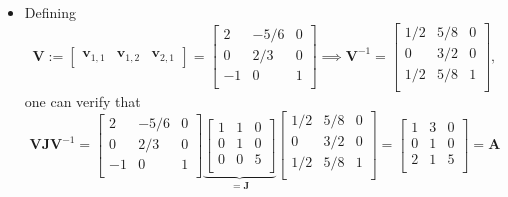 \documentclass[12pt,a4paper]{article}
\begin{document}
\begin{itemize}
\begin{itemize}
  \item Defining
    \begin{equation}\nonumber%
      \bm{V} :=
      \begin{bmatrix}
        \bm{v}_{1,1} & \bm{v}_{1,2} & \bm{v}_{2,1}
      \end{bmatrix}
      =
      \begin{bmatrix}
        2 & - 5/6 & 0 \\
        0 & 2/3 & 0 \\
        -1 & 0 & 1 \\
      \end{bmatrix}
      \implies
      \bm{V}^{-1}
      = 
      \begin{bmatrix}
        1/2 & 5/8 & 0 \\
        0 & 3/2 & 0 \\
        1/2 & 5/8 & 1 \\
      \end{bmatrix},
    \end{equation}
    one can verify that
    \begin{equation}\nonumber%
      \bm{V}\bm{J}\bm{V}^{-1}
      =
      \begin{bmatrix}
        2 & - 5/6 & 0 \\
        0 & 2/3 & 0 \\
        -1 & 0 & 1 \\
      \end{bmatrix}
      \underbrace{
      \begin{bmatrix}
        1 & 1 & 0 \\
        0 & 1 & 0 \\
        0 & 0 & 5 \\
      \end{bmatrix}}_{=\bm{J}}
      \begin{bmatrix}
        1/2 & 5/8 & 0 \\
        0 & 3/2 & 0 \\
        1/2 & 5/8 & 1 \\
      \end{bmatrix}
      =
      \begin{bmatrix}
        1 & 3 & 0 \\
        0 & 1 & 0 \\
        2 & 1 & 5 \\
      \end{bmatrix}
      = \bm{A}
    \end{equation}


\end{itemize}
\end{itemize}
\end{document}
